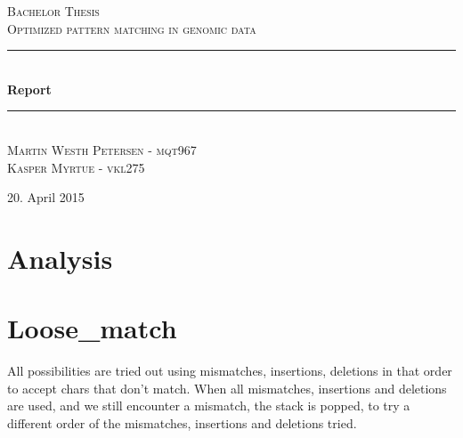 \documentclass[12pt]{article}
\newcommand{\HRule}{\rule{\linewidth}{0.5mm}}
\begin{document}
\begin{titlepage}
\begin{center}

\textsc{\Large Bachelor Thesis \\ Optimized pattern matching in genomic data\\[0.3cm]}
\HRule \\[0.4cm]
{ \LARGE \bfseries Report}\\[0.4cm]
\HRule \\[1.2cm]
\textsc{\large Martin Westh Petersen - mqt967 \\ Kasper Myrtue - vkl275}\\[1.0cm]
\end{center}
\begin{center}
\vfill
{\large 20. April 2015}
\end{center}
\end{titlepage}
\tableofcontents \newpage

\section{Analysis}
\section{Loose\_match}
All possibilities are tried out using mismatches, insertions, deletions in that order to accept chars that don't match.
When all mismatches, insertions and deletions are used, and we still encounter a mismatch, the stack is popped, to
try a different order of the mismatches, insertions and deletions tried.
\end{document}
